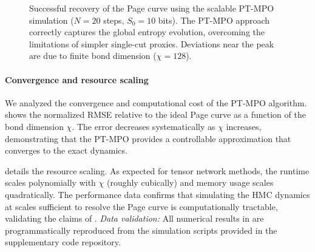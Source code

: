 \documentclass[a4paper,11pt]{article}
\newcommand{\HMC}{\textsc{HMC}\xspace}
\theoremstyle{plain}
\theoremstyle{definition}
\theoremstyle{remark}
\begin{document}
\begin{figure}[htbp]
\centering
{}
\caption{Successful recovery of the Page curve using the scalable PT-MPO simulation ($N=20$ steps, $S_0=10$ bits). The PT-MPO approach correctly captures the global entropy evolution, overcoming the limitations of simpler single-cut proxies. Deviations near the peak are due to finite bond dimension ($\chi=128$).}
\label{fig:ptmpo_page}
\end{figure}

\paragraph{Convergence and resource scaling}
We analyzed the convergence and computational cost of the PT-MPO algorithm.  shows the normalized RMSE relative to the ideal Page curve as a function of the bond dimension $\chi$. The error decreases systematically as $\chi$ increases, demonstrating that the PT-MPO provides a controllable approximation that converges to the exact dynamics.

 details the resource scaling. As expected for tensor network methods, the runtime scales polynomially with $\chi$ (roughly cubically) and memory usage scales quadratically. The performance data confirms that simulating the \HMC{} dynamics at scales sufficient to resolve the Page curve is computationally tractable, validating the claims of .
\emph{Data validation:} All numerical results in  are programmatically reproduced from the simulation scripts provided in the supplementary code repository.
\end{document}

